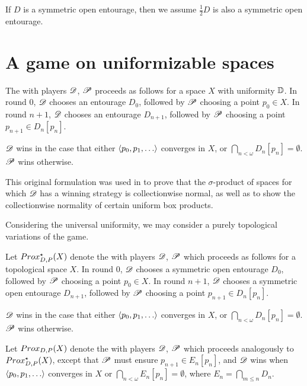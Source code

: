 If $D$ is a symmetric open entourage, then we assume $\frac{1}{2}D$ is
also a symmetric open entourage.

\section{A game on uniformizable spaces}

\begin{game}
  The  with players $\mathscr{D}$, $\mathscr{P}$
  proceeds as follows for a space $X$ with uniformity $\mathbb{D}$. In round $0$,
  $\mathscr{D}$ chooses an entourage $D_0$, followed by $\mathscr{P}$ choosing a point
  $p_0\in X$. In round $n+1$, $\mathscr{D}$ chooses an entourage $D_{n+1}$, followed
  by $\mathscr{P}$ choosing a point $p_{n+1}\in D_n[p_n]$.

  $\mathscr{D}$ wins in the case that either $\<p_0,p_1,\dots\>$ converges in $X$,
  or $\bigcap_{n<\omega}D_n[p_n] = \emptyset$. $\mathscr{P}$ wins otherwise.
\end{game}

This original formulation was used in \cite{MR3239205} to prove that the
$\sigma$-product of spaces for which $\mathscr{D}$ has a winning strategy is
collectionwise normal, as well as to show the collectionwise normality
of certain uniform box products.

Considering the universal uniformity, we may
consider a purely topological variations of the game.

\begin{game}
  Let $Prox^\star_{D,P}(X)$ denote the  with players $\mathscr{D}$,
  $\mathscr{P}$ which proceeds as follows for a topological space $X$. In round $0$,
  $\mathscr{D}$ chooses a symmetric open entourage $D_0$, followed by $\mathscr{P}$
  choosing a point $p_0\in X$. In round $n+1$, $\mathscr{D}$ chooses a symmetric
  open entourage $D_{n+1}$, followed
  by $\mathscr{P}$ choosing a point $p_{n+1}\in D_n[p_n]$.

  $\mathscr{D}$ wins in the case that either $\<p_0,p_1,\dots\>$ converges in $X$,
  or $\bigcap_{n<\omega}D_n[p_n] = \emptyset$. $\mathscr{P}$ wins otherwise.
\end{game}

\begin{game}
  Let $Prox_{D,P}(X)$ denote the  with players $\mathscr{D}$,
  $\mathscr{P}$ which proceeds analogously to $Prox^\star_{D,P}(X)$, except that
  $\mathscr{P}$ must ensure $p_{n+1}\in E_n[p_n]$,
  and $\mathscr{D}$ wins when $\<p_0,p_1,\dots\>$ converges in $X$
  or $\bigcap_{n<\omega}E_n[p_n] = \emptyset$, where
  $E_n=\bigcap_{m\leq n}D_n$.
\end{game}

